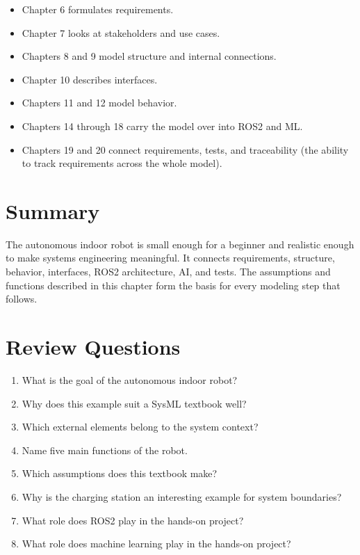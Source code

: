 \begin{itemize}
    \item Chapter 6 formulates requirements.
    \item Chapter 7 looks at stakeholders and use cases.
    \item Chapters 8 and 9 model structure and internal connections.
    \item Chapter 10 describes interfaces.
    \item Chapters 11 and 12 model behavior.
    \item Chapters 14 through 18 carry the model over into ROS2 and ML.
    \item Chapters 19 and 20 connect requirements, tests, and traceability (the ability to track requirements across the whole model).
\end{itemize}

\section{Summary}
The autonomous indoor robot is small enough for a beginner and realistic enough to make systems engineering meaningful. It connects requirements, structure, behavior, interfaces, ROS2 architecture, AI, and tests. The assumptions and functions described in this chapter form the basis for every modeling step that follows.

\section{Review Questions}
\begin{enumerate}
    \item What is the goal of the autonomous indoor robot?
    \item Why does this example suit a SysML textbook well?
    \item Which external elements belong to the system context?
    \item Name five main functions of the robot.
    \item Which assumptions does this textbook make?
    \item Why is the charging station an interesting example for system boundaries?
    \item What role does ROS2 play in the hands-on project?
    \item What role does machine learning play in the hands-on project?
\end{enumerate}

